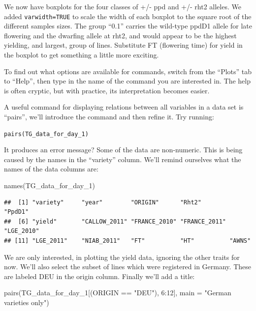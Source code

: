 \documentclass[
]{book}
\newenvironment{Shaded}{\begin{snugshade}}{\end{snugshade}}
\newcommand{\AttributeTok}[1]{\textcolor[rgb]{0.77,0.63,0.00}{#1}}
\newcommand{\DecValTok}[1]{\textcolor[rgb]{0.00,0.00,0.81}{#1}}
\newcommand{\FunctionTok}[1]{\textcolor[rgb]{0.00,0.00,0.00}{#1}}
\newcommand{\NormalTok}[1]{#1}
\newcommand{\SpecialCharTok}[1]{\textcolor[rgb]{0.00,0.00,0.00}{#1}}
\newcommand{\StringTok}[1]{\textcolor[rgb]{0.31,0.60,0.02}{#1}}
\begin{document}
We now have boxplots for the four classes of +/- ppd and +/- rht2 alleles. We added \texttt{varwidth=TRUE} to scale the width of each boxplot to the square root of the different samples sizes. The group ``0.1'' carries the wild-type ppdD1 allele for late flowering and the dwarfing allele at rht2, and would appear to be the highest yielding, and largest, group of lines. Substitute FT (flowering time) for yield in the boxplot to get something a little more exciting.

To find out what options are available for commands, switch from the ``Plots'' tab to ``Help'', then type in the name of the command you are interested in. The help is often cryptic, but with practice, its interpretation becomes easier.

A useful command for displaying relations between all variables in a data set is ``pairs'', we'll introduce the command and then refine it. Try running:

\texttt{pairs(TG\_data\_for\_day\_1)}

It produces an error message? Some of the data are non-numeric. This is being caused by the names in the ``variety'' column. We'll remind ourselves what the names of the data columns are:

\begin{Shaded}
\begin{Highlighting}[]
\FunctionTok{names}\NormalTok{(TG\_data\_for\_day\_1)}
\end{Highlighting}
\end{Shaded}

\begin{verbatim}
##  [1] "variety"     "year"        "ORIGIN"      "Rht2"        "PpdD1"      
##  [6] "yield"       "CALLOW_2011" "FRANCE_2010" "FRANCE_2011" "LGE_2010"   
## [11] "LGE_2011"    "NIAB_2011"   "FT"          "HT"          "AWNS"
\end{verbatim}

We are only interested, in plotting the yield data, ignoring the other traits for now. We'll also select the subset of lines which were registered in Germany. These are labeled DEU in the origin column. Finally we'll add a title:

\begin{Shaded}
\begin{Highlighting}[]
\FunctionTok{pairs}\NormalTok{(TG\_data\_for\_day\_1[(ORIGIN }\SpecialCharTok{==} \StringTok{"DEU"}\NormalTok{), }\DecValTok{6}\SpecialCharTok{:}\DecValTok{12}\NormalTok{], }\AttributeTok{main =} \StringTok{"German varieties only"}\NormalTok{)}
\end{Highlighting}
\end{Shaded}
\end{document}
